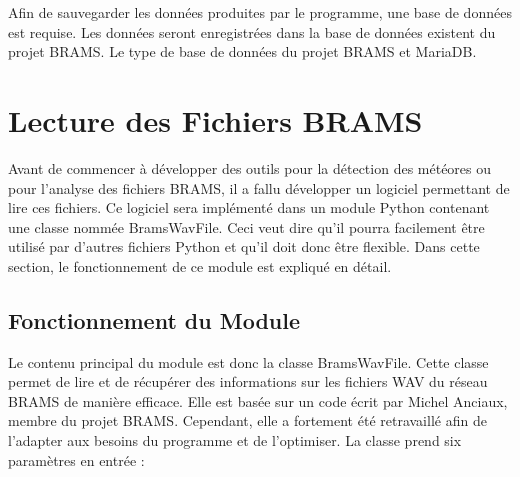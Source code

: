 \documentclass[11pt]{article}
\begin{document}
Afin de sauvegarder les données produites par le programme, une base de données est requise.
Les données seront enregistrées dans la base de données existent du projet BRAMS.
Le type de base de données du projet BRAMS et MariaDB.

\newpage

\section{Lecture des Fichiers BRAMS}

Avant de commencer à développer des outils pour la détection des météores ou pour l'analyse des fichiers BRAMS, il a fallu développer un logiciel permettant de lire ces fichiers.
Ce logiciel sera implémenté dans un module Python contenant une classe nommée BramsWavFile.
Ceci veut dire qu'il pourra facilement être utilisé par d'autres fichiers Python et qu'il doit donc être flexible.
Dans cette section, le fonctionnement de ce module est expliqué en détail.

\subsection{Fonctionnement du Module}

Le contenu principal du module est donc la classe BramsWavFile.
Cette classe permet de lire et de récupérer des informations sur les fichiers WAV du réseau BRAMS de manière efficace.
Elle est basée sur un code écrit par Michel Anciaux, membre du projet BRAMS.
Cependant, elle a fortement été retravaillé afin de l'adapter aux besoins du programme et de l'optimiser.
La classe prend six paramètres en entrée :
\end{document}
